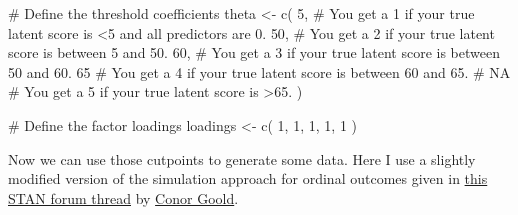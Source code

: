 \documentclass[
  letterpaper,
  DIV=11,
  numbers=noendperiod]{scrreprt}
\newenvironment{Shaded}{\begin{snugshade}}{\end{snugshade}}
\newcommand{\CommentTok}[1]{\textcolor[rgb]{0.37,0.37,0.37}{#1}}
\newcommand{\DecValTok}[1]{\textcolor[rgb]{0.68,0.00,0.00}{#1}}
\newcommand{\FunctionTok}[1]{\textcolor[rgb]{0.28,0.35,0.67}{#1}}
\newcommand{\NormalTok}[1]{\textcolor[rgb]{0.00,0.23,0.31}{#1}}
\newcommand{\OtherTok}[1]{\textcolor[rgb]{0.00,0.23,0.31}{#1}}
\begin{document}
\begin{Shaded}
\begin{Highlighting}[]
\CommentTok{\# Define the threshold coefficients}
\NormalTok{theta }\OtherTok{\textless{}{-}} \FunctionTok{c}\NormalTok{(}
    \DecValTok{5}\NormalTok{,  }\CommentTok{\# You get a 1 if your true \textquotesingle{}latent\textquotesingle{} score is \textless{}5 and all predictors are 0. }
    \DecValTok{50}\NormalTok{, }\CommentTok{\# You get a 2 if your true \textquotesingle{}latent\textquotesingle{} score is between 5 and 50.}
    \DecValTok{60}\NormalTok{, }\CommentTok{\# You get a 3 if your true \textquotesingle{}latent\textquotesingle{} score is between 50 and 60.}
    \DecValTok{65}  \CommentTok{\# You get a 4 if your true \textquotesingle{}latent\textquotesingle{} score is between 60 and 65.}
\CommentTok{\#   NA  \# You get a 5 if your true \textquotesingle{}latent\textquotesingle{} score is \textgreater{}65.}
\NormalTok{)}

\CommentTok{\# Define the factor loadings}
\NormalTok{loadings }\OtherTok{\textless{}{-}} \FunctionTok{c}\NormalTok{(}
    \DecValTok{1}\NormalTok{,}
    \DecValTok{1}\NormalTok{,}
    \DecValTok{1}\NormalTok{,}
    \DecValTok{1}\NormalTok{,}
    \DecValTok{1}
\NormalTok{)}
\end{Highlighting}
\end{Shaded}

Now we can use those cutpoints to generate some data. Here I use a
slightly modified version of the simulation approach for ordinal
outcomes given in
\href{https://discourse.mc-stan.org/t/how-to-simulate-monotonic-effects-with-an-ordinal-outcome/28705/2}{this
STAN forum thread} by
\href{https://scholar.google.com/citations?user=09SyjLoAAAAJ\&hl=en}{Conor
Goold}.
\end{document}
